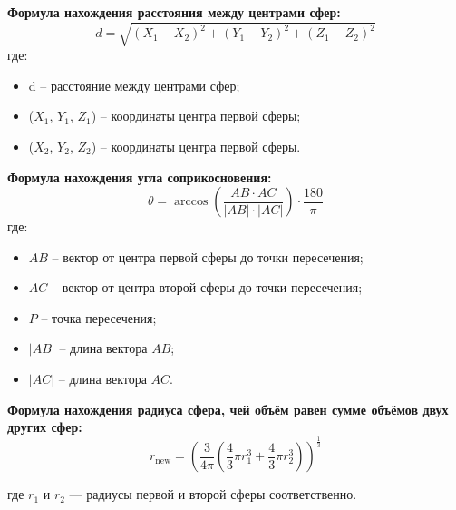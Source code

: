 \textbf{Формула нахождения расстояния между центрами сфер:}
\begin{equation} \label{eq:distance}
	d = \sqrt{(X_1 - X_2)^2 + (Y_1 - Y_2)^2 + (Z_1 - Z_2)^2}
\end{equation}
где: 
\begin{itemize}	
	\item d -- расстояние между центрами сфер;
	\item ($X_1$, $Y_1$, $Z_1$) -- координаты центра первой сферы;
	\item ($X_2$, $Y_2$, $Z_2$) -- координаты центра первой сферы.
\end{itemize}

\textbf{Формула нахождения угла соприкосновения:}
\begin{equation} \label{eq:angle}
	\theta = \arccos\left(\frac{AB \cdot AC}{|AB| \cdot |AC|}\right) \cdot \frac{180}{\pi}
\end{equation}
где:
\begin{itemize}	
	\item $AB$ -- вектор от центра первой сферы до точки пересечения;
	\item $AC$ -- вектор от центра второй сферы до точки пересечения;
	\item $P$ -- точка пересечения;
	\item $|AB|$ -- длина вектора $AB$;
	\item $|AC|$ -- длина вектора $AC$.
\end{itemize}

\textbf{Формула нахождения радиуса сфера, чей объём равен сумме объёмов двух других сфер:}
\begin{equation}
	r_{\text{new}} = \left( \frac{3}{4\pi} \left( \frac{4}{3} \pi r_1^3 + \frac{4}{3} \pi r_2^3 \right) \right)^{\frac{1}{3}}
\end{equation}

где $r_1$ и $r_2$ — радиусы первой и второй сферы соответственно.

